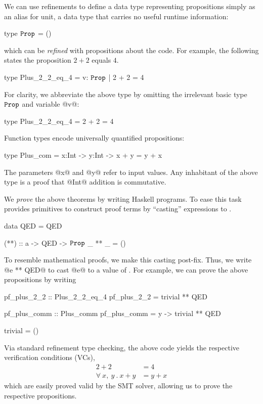 %
We can use refinements to define a data type
representing propositions simply as an alias
for unit, a data type that carries no useful
runtime information:
%
\begin{mcode}
  type $\texttt{Prop}$ = ()
\end{mcode}
%
which can be \emph{refined} with
propositions about the code.
%
For example, the following states the proposition
$2 + 2$ equals $4$.
%
\begin{mcode}
  type Plus_2_2_eq_4 = { v: $\texttt{Prop}$ | 2 + 2 = 4 }
\end{mcode}
%
For clarity, we abbreviate the above type by omitting
the irrelevant basic type $\texttt{Prop}$ and variable @v@:
%
\begin{mcode}
  type Plus_2_2_eq_4 = { 2 + 2 = 4 }
\end{mcode}
%
Function types encode universally quantified propositions:
%
\begin{mcode}
  type Plus_com = x:Int -> y:Int -> { x + y = y + x }
\end{mcode}
%
The parameters @x@ and @y@ refer to input
values. Any inhabitant of the above type is a
proof that @Int@ addition is commutative.

%
We \emph{prove} the above theorems by
writing Haskell programs. To ease this task \toolname
provides primitives to construct proof terms by
``casting'' expressions to \typp.
%
\begin{mcode}
  data QED = QED

  (**) :: a -> QED -> $\texttt{Prop}$
  _ ** _  = ()
\end{mcode}
%
To resemble mathematical proofs, we make this casting post-fix.
Thus, we write @e ** QED@ to cast @e@ to a value of \typp.
%
For example, we can prove the above propositions by writing
%
\begin{code}
  pf_plus_2_2 :: Plus_2_2_eq_4
  pf_plus_2_2 = trivial ** QED

  pf_plus_comm :: Plus_comm
  pf_plus_comm = \x y -> trivial ** QED

  trivial = ()
\end{code}
%
Via standard refinement type checking, the above code yields
the respective verification conditions (VCs),
%
\begin{align*}
                      2 + 2 & = 4 \\
  \forall \ x,\ y\ .\ x + y & = y + x
\end{align*}
%
which are easily proved valid by the SMT solver, allowing us
to prove the respective propositions.

